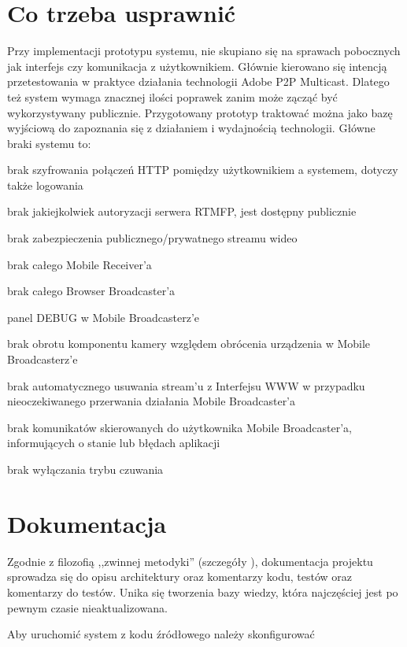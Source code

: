 \section{Co trzeba usprawnić}

Przy implementacji prototypu systemu, nie skupiano się na sprawach pobocznych jak interfejs czy komunikacja z użytkownikiem. Głównie kierowano się intencją przetestowania w praktyce działania technologii Adobe P2P Multicast. Dlatego też system wymaga znacznej ilości poprawek zanim może zącząć być wykorzystywany publicznie. Przygotowany prototyp traktować można jako bazę wyjściową do zapoznania się z działaniem i wydajnością technologii. Główne braki systemu to:

\begin{packed_item}
    \item{brak szyfrowania połączeń HTTP pomiędzy użytkownikiem a systemem, dotyczy także logowania}
    \item{brak jakiejkolwiek autoryzacji serwera RTMFP, jest dostępny publicznie}
    \item{brak zabezpieczenia publicznego/prywatnego streamu wideo}
    \item{brak całego Mobile Receiver'a}
    \item{brak całego Browser Broadcaster'a}
    \item{panel DEBUG w Mobile Broadcasterz'e}
    \item{brak obrotu komponentu kamery względem obrócenia urządzenia w Mobile Broadcasterz'e}
    \item{brak automatycznego usuwania stream'u z Interfejsu WWW w przypadku nieoczekiwanego przerwania działania Mobile Broadcaster'a}
    \item{brak komunikatów skierowanych do użytkownika Mobile Broadcaster'a, informujących o stanie lub błędach aplikacji}
    \item{brak wyłączania trybu czuwania}
\end{packed_item}


\section{Dokumentacja}
Zgodnie z filozofią ,,zwinnej metodyki'' (szczegóły ), dokumentacja projektu sprowadza się do opisu architektury oraz komentarzy kodu, testów oraz komentarzy do testów. Unika się tworzenia bazy wiedzy, która najczęściej jest po pewnym czasie nieaktualizowana.

Aby uruchomić system z kodu źródłowego należy skonfigurować 

